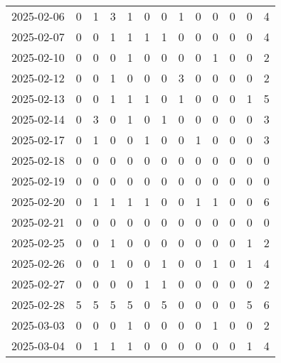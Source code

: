 \documentclass[dvipdfmx,oneside]{article}
\begin{document}
\begin{longtable}{lcccccccccccc}
        2025-02-06 &     0 &     1 &     3 &     1 &     0 &     0 &     1 &     0 &     0 &     0 &     0 &      4 \\
        2025-02-07 &     0 &     0 &     1 &     1 &     1 &     1 &     0 &     0 &     0 &     0 &     0 &      4 \\
        2025-02-10 &     0 &     0 &     0 &     1 &     0 &     0 &     0 &     0 &     1 &     0 &     0 &      2 \\
        2025-02-12 &     0 &     0 &     1 &     0 &     0 &     0 &     3 &     0 &     0 &     0 &     0 &      2 \\
        2025-02-13 &     0 &     0 &     1 &     1 &     1 &     0 &     1 &     0 &     0 &     0 &     1 &      5 \\
        2025-02-14 &     0 &     3 &     0 &     1 &     0 &     1 &     0 &     0 &     0 &     0 &     0 &      3 \\
        2025-02-17 &     0 &     1 &     0 &     0 &     1 &     0 &     0 &     1 &     0 &     0 &     0 &      3 \\
        2025-02-18 &     0 &     0 &     0 &     0 &     0 &     0 &     0 &     0 &     0 &     0 &     0 &      0 \\
        2025-02-19 &     0 &     0 &     0 &     0 &     0 &     0 &     0 &     0 &     0 &     0 &     0 &      0 \\
        2025-02-20 &     0 &     1 &     1 &     1 &     1 &     0 &     0 &     1 &     1 &     0 &     0 &      6 \\
        2025-02-21 &     0 &     0 &     0 &     0 &     0 &     0 &     0 &     0 &     0 &     0 &     0 &      0 \\
        2025-02-25 &     0 &     0 &     1 &     0 &     0 &     0 &     0 &     0 &     0 &     0 &     1 &      2 \\
        2025-02-26 &     0 &     0 &     1 &     0 &     0 &     1 &     0 &     0 &     1 &     0 &     1 &      4 \\
        2025-02-27 &     0 &     0 &     0 &     0 &     1 &     1 &     0 &     0 &     0 &     0 &     0 &      2 \\
        2025-02-28 &     5 &     5 &     5 &     5 &     0 &     5 &     0 &     0 &     0 &     0 &     5 &      6 \\
        2025-03-03 &     0 &     0 &     0 &     1 &     0 &     0 &     0 &     0 &     1 &     0 &     0 &      2 \\
        2025-03-04 &     0 &     1 &     1 &     1 &     0 &     0 &     0 &     0 &     0 &     0 &     1 &      4 \\

\end{longtable}
\end{document}

